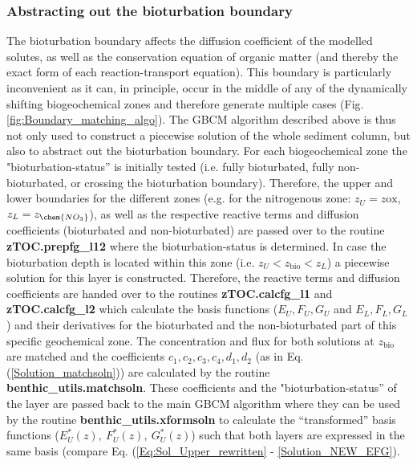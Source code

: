 \documentclass[gmd, manuscript]{copernicus}
\begin{document}
\subsubsection{Abstracting out the bioturbation boundary}
The bioturbation boundary affects the diffusion coefficient of the modelled solutes, as well as the conservation equation of organic matter (and thereby the exact form of each reaction-transport equation). 
This boundary is particularly inconvenient as it can, in principle, occur in the middle of any of the dynamically shifting biogeochemical zones and therefore generate multiple cases 
(Fig. \ref{fig:Boundary_matching_algo}). 
The GBCM algorithm described above is thus not only used to construct a piecewise solution of the whole sediment column, but also to abstract out the bioturbation boundary. 
For each biogeochemical zone the "bioturbation-status'' is initially tested (i.e. fully bioturbated, fully non-bioturbated, or crossing the bioturbation boundary). 
Therefore, the upper and lower boundaries for the different zones (e.g. for the nitrogenous zone: $z_U = z\mathrm{ox}$, $z_L = z_\chem{NO_3}$), as well as the respective reactive terms and diffusion coefficients 
(bioturbated and non-bioturbated) are passed over to the routine \textsf{\textbf{zTOC.prepfg\_l12}} where the bioturbation-status is determined. In case the bioturbation depth is located within this zone 
(i.e. $z_U < z_\mathrm{bio} < z_L$) a piecewise solution for this layer is constructed. Therefore, the reactive terms and diffusion coefficients are handed over to the routines \textsf{\textbf{zTOC.calcfg\_l1}} and 
\textsf{\textbf{zTOC.calcfg\_l2}} which calculate the basis functions ($E_U, F_U, G_U$ and  $E_L, F_L, G_L$) and their derivatives for the bioturbated and the non-bioturbated part of this specific geochemical zone. 
The concentration and flux for both solutions at $z_\mathrm{bio}$ are matched and the coefficients $c_1, c_2, c_3, c_4, d_1, d_2$ (as in Eq. (\ref{Solution_matchsoln})) are calculated by the routine 
\textsf{\textbf{benthic\_utils.matchsoln}}. These coefficients and the "bioturbation-status'' of the layer are passed back to the main GBCM algorithm where they can be used by the routine \textsf{\textbf{benthic\_utils.xformsoln}} 
to calculate the ``transformed'' basis functions ($E_U^*(z),\ F_U^*(z),\ G_U^*(z)$) such that both layers are expressed in the same basis (compare Eq. (\ref{Eq:Sol_Upper_rewritten} - \ref{Solution_NEW_EFG}). 
\end{document}
